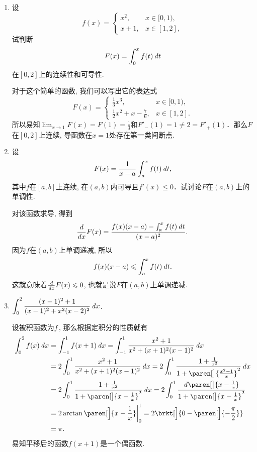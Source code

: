 \begin{enumerate}
\item 设
  \[
    f(x) =
    \begin{cases}
      x^2, & x \in [0,1), \\
      x+1, & x \in [1,2],
    \end{cases}
  \]
  试判断
  \[
    F(x) = \int_0^x f(t) \mathop{}\!\mathit{d} t
  \]
  在\([0,2]\)上的连续性和可导性.

  \ifshowsol
    对于这个简单的函数, 我们可以写出它的表达式
    \[
      F(x) =
      \begin{cases}
        \frac13 x^3, & x \in [0,1), \\
        \frac12 x^2 + x - \frac76, & x \in [1,2].
      \end{cases}
    \]
    所以易知\(\lim_{x\to1} F(x) = F(1) = \frac13\)和\(F'_-(1) = 1 \ne 2 = F'_+(1)\)．那么\(F\)在\([0,2]\)上连续, 导函数在\(x=1\)处存在第一类间断点.
  \fi

\item 设
  \[
    F(x) = \frac1{x-a} \int_a^x f(t) \mathop{}\!\mathit{d} t,
  \]
  其中\(f\)在\([a,b]\)上连续, 在\((a,b)\)内可导且\(f'(x) \le 0\)．试讨论\(F\)在\((a,b)\)上的单调性.

  \ifshowsol
    对该函数求导, 得到
    \[
      \frac{\mathop{}\!\mathit{d}}{\mathop{}\!\mathit{d} x} F(x) = \frac{f(x)(x-a) - \int_a^x f(t) \mathop{}\!\mathit{d} t}{(x-a)^2}.
    \]
    因为\(f\)在\((a,b)\)上单调递减, 所以
    \[
      f(x)(x-a) \le \int_a^x f(t) \dt.
    \]
    这就意味着\(\ddx F(x) \le 0\), 也就是说\(F\)在\((a,b)\)上单调递减.
  \fi

\item \(\displaystyle \int_0^2 \frac{(x-1)^2 + 1}{(x-1)^2 + x^2 (x-2)^2} \mathop{}\!\mathit{d} x\).

  \ifshowsol
    设被积函数为\(f\,\), 那么根据定积分的性质就有
    \[
      \begin{split}
        \int_0^2 f(x) \dx
        &= \int_{-1}^1 f(x+1) \dx
          = \int_{-1}^1 \frac{x^2 + 1}{x^2 + (x+1)^2 (x-1)^2} \dx \\
        &= 2 \int_0^1 \frac{x^2 + 1}{x^2 + (x+1)^2 (x-1)^2} \dx
          = 2 \int_0^1 \frac{1 + \frac{1}{x^2}}{1 + \paren[\big]{\frac{x^2-1}{x}}^2} \dx \\
        &= 2 \int_0^1 \frac{1 + \frac{1}{x^2}}{1 + \paren[\big]{x - \frac{1}{x}}^2} \dx
          = 2 \int_0^1 \frac{\diff\paren[\big]{x - \frac{1}{x}}}{1 + \paren[\big]{x - \frac{1}{x}}^2} \\
        &= 2 \arctan\paren[\Big]{x - \frac{1}{x}}\bigg\vert_0^1
          = 2 \brkt[\Big]{0 - \paren[\Big]{-\frac{\pi}{2}}} \\
        &= \pi.
      \end{split}
    \]
    易知平移后的函数\(f(x+1)\)是一个偶函数.
  \fi


\end{enumerate}
